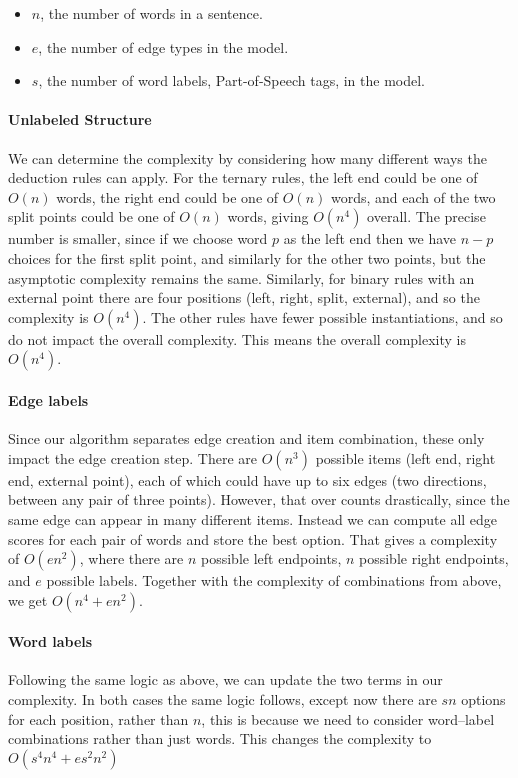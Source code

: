 \begin{itemize}
  \item $n$, the number of words in a sentence.
  \item $e$, the number of edge types in the model.
  \item $s$, the number of word labels, \myeg Part-of-Speech tags, in the model.
\end{itemize}

\paragraph{Unlabeled Structure}
We can determine the complexity by considering how many different ways the deduction rules can apply.
For the ternary rules, the left end could be one of $O(n)$ words, the right end could be one of $O(n)$ words, and each of the two split points could be one of $O(n)$ words, giving $O(n^4)$ overall.
The precise number is smaller, since if we choose word $p$ as the left end then we have $n-p$ choices for the first split point, and similarly for the other two points, but the asymptotic complexity remains the same.
Similarly, for binary rules with an external point there are four positions (left, right, split, external), and so the complexity is $O(n^4)$.
The other rules have fewer possible instantiations, and so do not impact the overall complexity.
This means the overall complexity is $O(n^4)$.

\paragraph{Edge labels}
Since our algorithm separates edge creation and item combination, these only impact the edge creation step.
There are $O(n^3)$ possible items (left end, right end, external point), each of which could have up to six edges (two directions, between any pair of three points).
However, that over counts drastically, since the same edge can appear in many different items.
Instead we can compute all edge scores for each pair of words and store the best option.
That gives a complexity of $O(e n^2)$, where there are $n$ possible left endpoints, $n$ possible right endpoints, and $e$ possible labels.
Together with the complexity of combinations from above, we get $O(n^4 + e n^2)$.

\paragraph{Word labels}
Following the same logic as above, we can update the two terms in our complexity.
In both cases the same logic follows, except now there are $s n$ options for each position, rather than $n$, this is because we need to consider word--label combinations rather than just words.
This changes the complexity to $O(s^4 n^4 + e s^2 n^2)$ \\

